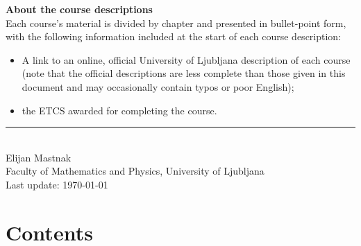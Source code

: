 \documentclass[11pt, a4paper]{article}
\begin{document}
\begin{center}
\begin{minipage}[t]{0.90\textwidth}
\begin{itemize}
    \end{itemize}

    \vspace{2ex}
    \textbf{\large About the course descriptions}\\[0.5ex]
    Each course's material is divided by chapter and presented in bullet-point form, with the following information included at the start of each course description:
    \begin{itemize}
    
        \item A link to an online, official University of Ljubljana description of each course
        (note that the official descriptions are less complete than those given in this document and may occasionally contain typos or poor English);

        \item the ETCS awarded for completing the course.

    \end{itemize}
\end{minipage}

\vfill

\rule{0.45\linewidth}{0.4pt}\\
Elijan Mastnak\\
Faculty of Mathematics and Physics, University of Ljubljana\\
Last update: \today

\end{center}
\newpage

\section*{Contents}
\pagestyle{empty}
\end{document}
